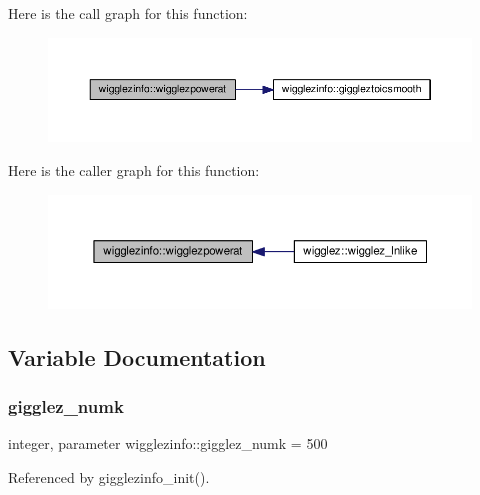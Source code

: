 Here is the call graph for this function\+:
\nopagebreak
\begin{figure}[H]
\begin{center}
\leavevmode
\includegraphics[width=350pt]{namespacewigglezinfo_acb08f5ab3e49247de82dbfb12666f12e_cgraph}
\end{center}
\end{figure}
Here is the caller graph for this function\+:
\nopagebreak
\begin{figure}[H]
\begin{center}
\leavevmode
\includegraphics[width=350pt]{namespacewigglezinfo_acb08f5ab3e49247de82dbfb12666f12e_icgraph}
\end{center}
\end{figure}


\subsection{Variable Documentation}
\mbox{\label{namespacewigglezinfo_aeea1af41c9bde44daa886428c2d864af}} 
\subsubsection{\texorpdfstring{gigglez\+\_\+numk}{gigglez\_numk}}
{\footnotesize\ttfamily integer, parameter wigglezinfo\+::gigglez\+\_\+numk = 500}



Referenced by gigglezinfo\+\_\+init().

\mbox{\label{namespacewigglezinfo_a4a6cdfc8a72a4b74579fed9741cd9d05}} 
